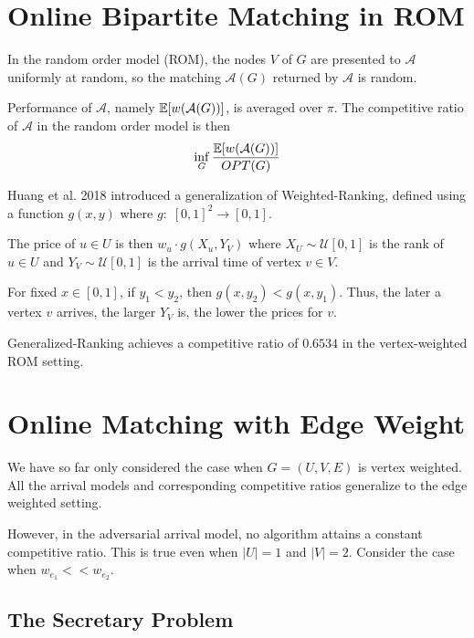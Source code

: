 



\section{Online Bipartite Matching in ROM}

In the random order model (ROM), the nodes $V$ of $G$ are presented to $\mathcal{A}$ uniformly at random, so the matching $\mathcal{A}(G)$ returned by $\mathcal{A}$ is random.

Performance of $\mathcal{A}$, namely $\mathbb{E}[w(\mathcal{A}(G))]$, is averaged over $\pi$. The competitive ratio of $\mathcal{A}$ in the random order model is then
$$
\inf_{G} \frac{\mathbb{E}[w(\mathcal{A}(G))]}{OPT(G)}
$$

Huang et al. 2018 introduced a generalization of Weighted-Ranking, defined using a function $g(x,y)$ where $g:\; [0,1]^2 \to [0,1]$.

The price of $u \in U$ is then $w_u \cdot g(X_u,Y_V)$ where $X_U \sim \mathcal{U}[0,1]$ is the rank of $u \in U$ and $Y_V \sim \mathcal{U}[0,1]$ is the arrival time of vertex $v \in V$.

For fixed $x \in [0,1]$, if $y_1 < y_2$, then $g(x,y_2) < g(x,y_1)$. Thus, the later a vertex $v$ arrives, the larger $Y_V$ is, the lower the prices for $v$.

\begin{theorem}
    Generalized-Ranking achieves a competitive ratio of $0.6534$ in the vertex-weighted ROM setting.
\end{theorem}

\section{Online Matching with Edge Weight}

We have so far only considered the case when $G = (U,V,E)$ is vertex weighted. All the arrival models and corresponding competitive ratios generalize to the edge weighted setting.

However, in the adversarial arrival model, no algorithm attains a constant competitive ratio. This is true even when $|U|=1$ and $|V|=2$. Consider the case when $w_{e_1} << w_{e_2}$.

\subsection{The Secretary Problem}

